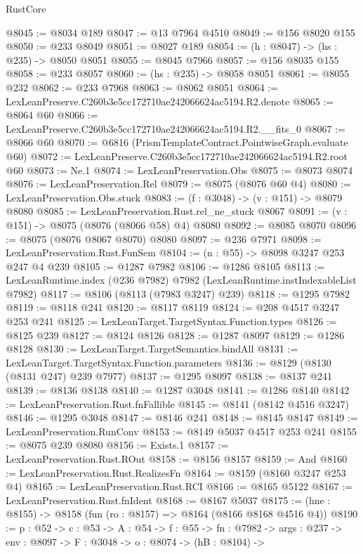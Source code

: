 \begin{lexlean}{RustCore}
\begin{coremodule}
@8045 := @8034 @189
@8047 := @13 @7964 @4510
@8049 := @156 @8020 @155
@8050 := @233 @8049
@8051 := @8027 @189
@8054 := (h : @8047) -> (hs : @235) -> @8050 @8051
@8055 := @8045 @7966
@8057 := @156 @8035 @155
@8058 := @233 @8057
@8060 := (hs : @235) -> @8058 @8051
@8061 := @8055 @232
@8062 := @233 @7968
@8063 := @8062 @8051
@8064 := LexLeanPreserve.C260b3e5cc172710ae242066624ac5194.R2.denote
@8065 := @8064 @60
@8066 := LexLeanPreserve.C260b3e5cc172710ae242066624ac5194.R2.__fits_0
@8067 := @8066 @60
@8070 := @6816 (PrismTemplateContract.PointwiseGraph.evaluate @60)
@8072 := LexLeanPreserve.C260b3e5cc172710ae242066624ac5194.R2.root @60
@8073 := Ne.{1}
@8074 := LexLeanPreservation.Obs
@8075 := @8073 @8074
@8076 := LexLeanPreservation.Rel
@8079 := @8075 (@8076 @60 @4)
@8080 := LexLeanPreservation.Obs.stuck
@8083 := (f : @3048) -> (v : @151) -> @8079 @8080
@8085 := LexLeanPreservation.Rust.rel_ne_stuck @8067
@8091 := (v : @151) -> @8075 (@8076 (@8066 @58) @4) @8080
@8092 := @8085 @8070
@8096 := @8075 (@8076 @8067 @8070) @8080
@8097 := @236 @7971
@8098 := LexLeanPreservation.Rust.FunSem
@8104 := (n : @55) -> @8098 @3247 @253 @247 @4 @239
@8105 := @1287 @7982
@8106 := @1286 @8105
@8113 := LexLeanRuntime.index (@236 @7982) @7982 (LexLeanRuntime.instIndexableList @7982)
@8117 := @8106 (@8113 (@7983 @3247) @239)
@8118 := @1295 @7982
@8119 := @8118 @241
@8120 := @8117 @8119
@8124 := @208 @4517 @3247 @253 @241
@8125 := LexLeanTarget.TargetSyntax.Function.types
@8126 := @8125 @239
@8127 := @8124 @8126
@8128 := @1287 @8097
@8129 := @1286 @8128
@8130 := LexLeanTarget.TargetSemantics.bindAll
@8131 := LexLeanTarget.TargetSyntax.Function.parameters
@8136 := @8129 (@8130 (@8131 @247) @239 @7977)
@8137 := @1295 @8097
@8138 := @8137 @241
@8139 := @8136 @8138
@8140 := @1287 @3048
@8141 := @1286 @8140
@8142 := LexLeanPreservation.Rust.fnFallible
@8145 := @8141 (@8142 @4516 @3247)
@8146 := @1295 @3048
@8147 := @8146 @241
@8148 := @8145 @8147
@8149 := LexLeanPreservation.RunConv
@8153 := @8149 @5037 @4517 @253 @241
@8155 := @8075 @239 @8080
@8156 := Exists.{1}
@8157 := LexLeanPreservation.Rust.ROut
@8158 := @8156 @8157
@8159 := And
@8160 := LexLeanPreservation.Rust.RealizesFn
@8164 := @8159 (@8160 @3247 @253 @4)
@8165 := LexLeanPreservation.Rust.RCI
@8166 := @8165 @5122
@8167 := LexLeanPreservation.Rust.fnIdent
@8168 := @8167 @5037
@8175 := (hne : @8155) -> @8158 (fun (ro : @8157) => @8164 (@8166 @8168 @4516 @4))
@8190 := {p : @52} ->
  {c : @53} ->
  {A : @54} ->
  {f : @55} ->
  {fn : @7982} ->
  {args : @237} ->
  {env : @8097} ->
  {F : @3048} ->
  {o : @8074} ->
  (hB : @8104) ->

\end{coremodule}
\end{lexlean}
